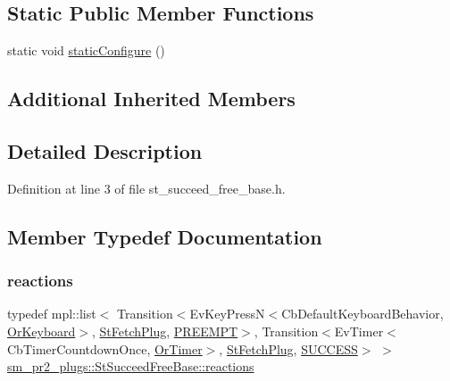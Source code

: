 \subsection*{Static Public Member Functions}
\begin{DoxyCompactItemize}
\item 
static void \hyperlink{structsm__pr2__plugs_1_1StSucceedFreeBase_aeae400a9749af1efbe82e16b1b72529b}{static\+Configure} ()
\end{DoxyCompactItemize}
\subsection*{Additional Inherited Members}


\subsection{Detailed Description}


Definition at line 3 of file st\+\_\+succeed\+\_\+free\+\_\+base.\+h.



\subsection{Member Typedef Documentation}
\mbox{\label{structsm__pr2__plugs_1_1StSucceedFreeBase_a14771e3fa3c17d96f2b8c3f6f39089ec}} 
\subsubsection{\texorpdfstring{reactions}{reactions}}
{\footnotesize\ttfamily typedef mpl\+::list$<$ Transition$<$Ev\+Key\+PressN$<$Cb\+Default\+Keyboard\+Behavior, \hyperlink{classsm__pr2__plugs_1_1OrKeyboard}{Or\+Keyboard}$>$, \hyperlink{structsm__pr2__plugs_1_1StFetchPlug}{St\+Fetch\+Plug}, \hyperlink{classPREEMPT}{P\+R\+E\+E\+M\+PT}$>$, Transition$<$Ev\+Timer$<$Cb\+Timer\+Countdown\+Once, \hyperlink{classsm__pr2__plugs_1_1OrTimer}{Or\+Timer}$>$, \hyperlink{structsm__pr2__plugs_1_1StFetchPlug}{St\+Fetch\+Plug}, \hyperlink{classSUCCESS}{S\+U\+C\+C\+E\+SS}$>$ $>$ \hyperlink{structsm__pr2__plugs_1_1StSucceedFreeBase_a14771e3fa3c17d96f2b8c3f6f39089ec}{sm\+\_\+pr2\+\_\+plugs\+::\+St\+Succeed\+Free\+Base\+::reactions}}



